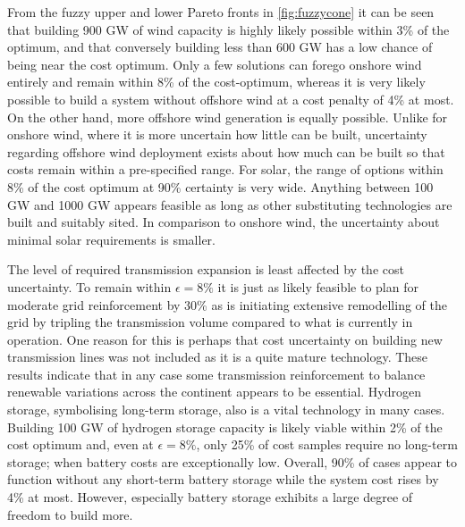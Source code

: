 From the fuzzy upper and lower Pareto fronts in \cref{fig:fuzzycone} it can be
seen that building 900 GW of wind capacity is highly likely possible within 3\%
of the optimum, and that conversely building less than 600 GW has a low chance
of being near the cost optimum. Only a few solutions can forego onshore wind
entirely and remain within 8\% of the cost-optimum, whereas it is very likely
possible to build a system without offshore wind at a cost penalty of 4\% at
most. On the other hand, more offshore wind generation is equally possible.
Unlike for onshore wind, where it is more uncertain how little can be built,
uncertainty regarding offshore wind deployment exists about how much can be
built so that costs remain within a pre-specified range. For solar, the range of
options within 8\% of the cost optimum at 90\% certainty is very wide. Anything
between 100 GW and 1000 GW appears feasible as long as other substituting
technologies are built and suitably sited. In comparison to onshore wind, the
uncertainty about minimal solar requirements is smaller.

The level of required transmission expansion is least affected by the cost
uncertainty. To remain within $\epsilon=8\%$ it is just as likely feasible to
plan for moderate grid reinforcement by 30\% as is initiating extensive
remodelling of the grid by tripling the transmission volume compared to what is
currently in operation. One reason for this is perhaps that cost uncertainty on
building new transmission lines was not included as it is a quite mature
technology. These results indicate that in any case some transmission
reinforcement to balance renewable variations across the continent appears to be
essential. Hydrogen storage, symbolising long-term storage, also is a vital
technology in many cases. Building 100 GW of hydrogen storage capacity is likely
viable within 2\% of the cost optimum and, even at $\epsilon=8\%$, only 25\% of
cost samples require no long-term storage; when battery costs are exceptionally
low. Overall, 90\% of cases appear to function without any short-term battery
storage while the system cost rises by 4\% at most. However, especially battery
storage exhibits a large degree of freedom to build more.


